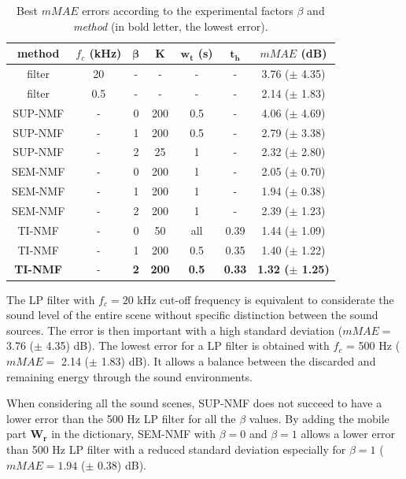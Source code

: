 \documentclass[review,5p,twocolumn,sort&compress,times]{elsarticle}
\begin{document}
\begin{table}[t]
\centering
\caption{Best $mMAE$ errors according to the experimental factors $\beta$ and \textit{method} (in bold letter, the lowest error).}
\begin{tabular}{@{}ccccccc@{}}
\toprule
\textbf{method} & $f_c$ (kHz) & $\mathbf{\beta}$ & $\mathbf{K}$ & $\mathbf{w_t}$ (s) &  $\mathbf{t_h}$ &  \textbf{$mMAE$} (dB) \\ \midrule
filter & 20 & - & - & - & - & 3.76 ($\pm$ 4.35) \\
filter & 0.5 & - & - & - & - & 2.14 ($\pm$ 1.83) \\ 
\hline \hline
SUP-NMF & - & 0 & 200 & 0.5 & - & 4.06 ($\pm$ 4.69) \\
SUP-NMF & - & 1 & 200 & 0.5 & - & 2.79 ($\pm$ 3.38) \\
SUP-NMF & - & 2 & 25 & 1 & - & 2.32  ($\pm$ 2.80) \\ 
\hline \hline
SEM-NMF & - & 0 & 200 & 1 & - & 2.05 ($\pm$ 0.70) \\
SEM-NMF & - & 1 & 200 & 1 & - & 1.94 ($\pm$ 0.38) \\
SEM-NMF & - & 2 & 200 & 1 & - & 2.39 ($\pm$ 1.23) \\ 
\hline \hline
TI-NMF & - & 0 & 50 & all & 0.39 & 1.44 ($\pm$ 1.09)\\
TI-NMF & - & 1 & 200 & 0.5 & 0.35 & 1.40 ($\pm$ 1.22)\\
\textbf{TI-NMF }& - & \textbf{2} & \textbf{200} & \textbf{0.5} & \textbf{0.33} & \textbf{1.32 ($\pm$ 1.25)}\\
\bottomrule
\end{tabular}
\label{tab:results}
\end{table}

The LP filter with $f_c = 20$ kHz cut-off frequency is equivalent to considerate the sound level of the entire scene without specific distinction between the sound sources. The error is then important with a high standard deviation ($mMAE =$ 3.76 ($\pm$ 4.35) dB). The lowest error for a LP filter is obtained with $f_c$ = 500 Hz ($mMAE =$ 2.14 ($\pm$ 1.83) dB). It allows a balance between the discarded and remaining energy through the sound environments.

When considering all the sound scenes, SUP-NMF does not succeed to have a lower error than the 500 Hz LP filter for all the $\beta$ values. By adding the mobile part $\mathbf{W_r}$ in the dictionary, SEM-NMF with $\beta = 0$ and $\beta = 1$ allows a lower error than 500 Hz LP filter with a reduced standard deviation especially for $\beta = 1$ ($mMAE = 1.94$ ($\pm$ 0.38) dB).
\end{document}
